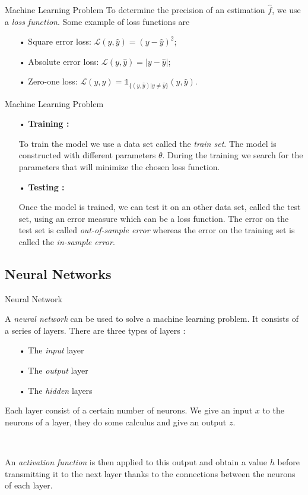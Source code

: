 \documentclass[11pt]{beamer}
\begin{document}
\begin{frame}{Machine Learning Problem}
To determine the precision of an estimation $\hat{f}$, we use a \textit{loss function}. Some example of loss functions are
\begin{itemize}
\item[•] Square error loss: $\mathcal{L}(y, \hat{y}) = (y-\hat{y})^2$;
\item[•] Absolute error loss: $\mathcal{L}(y, \hat{y}) = |y - \hat{y}|$;
\item[•] Zero-one loss: $\mathcal{L}(y, \hat{y}) = \mathds{1}_{\{(y, \hat{y}) | y\neq \hat{y}\}}(y, \hat{y})$.
\end{itemize}
\end{frame}

\begin{frame}{Machine Learning Problem}
\begin{itemize}
\item[•] \textbf{Training : } 

To train the model we use a data set called the \textit{train set}. The model is
constructed with different parameters $\theta$. During the training we search for the
parameters that will minimize the chosen loss function. 
\item[•] \textbf{Testing : } 

Once the model is trained, we can test it on an other data set, called the test set, using an
error measure which can be a loss function. The error on the test set is called
\textit{out-of-sample error} whereas the error on the training set is called the \textit{in-sample
error}.
\end{itemize}
\end{frame}

\subsection{Neural Networks}
\begin{frame}{Neural Network}
\begin{definition}
A \textit{neural network} \cite{5} can be used to solve a machine learning problem. It consists of a series of layers. There are three types of layers :

\begin{itemize}
\item[•] The \textit{input} layer
\item[•] The \textit{output} layer
\item[•] The \textit{hidden} layers
\end{itemize}
Each layer consist of a certain number of neurons. We give an input $x$ to the neurons of a layer, they do some calculus and give an output $z$.

~

An \textit{activation function} is then applied to this output and obtain a value $h$ before transmitting it to the next layer thanks to the connections between the neurons of each layer.
\end{definition}
\end{frame}
\end{document}
